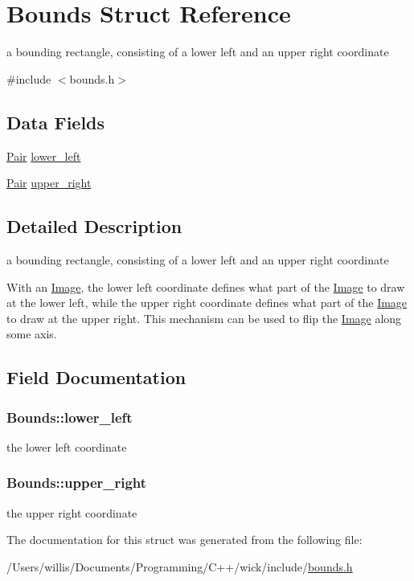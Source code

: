 \hypertarget{struct_bounds}{\section{Bounds Struct Reference}
\label{struct_bounds}
}


a bounding rectangle, consisting of a lower left and an upper right coordinate  




{\ttfamily \#include $<$bounds.\-h$>$}

\subsection*{Data Fields}
\begin{DoxyCompactItemize}
\item 
\hyperlink{struct_pair}{Pair} \hyperlink{struct_bounds_afeb7fdbefb43679fe1a47537763a2ddc}{lower\-\_\-left}
\item 
\hyperlink{struct_pair}{Pair} \hyperlink{struct_bounds_af16cda4ded29fa7a4eb016735ce20730}{upper\-\_\-right}
\end{DoxyCompactItemize}


\subsection{Detailed Description}
a bounding rectangle, consisting of a lower left and an upper right coordinate 

With an \hyperlink{struct_image}{Image}, the lower left coordinate defines what part of the \hyperlink{struct_image}{Image} to draw at the lower left, while the upper right coordinate defines what part of the \hyperlink{struct_image}{Image} to draw at the upper right. This mechanism can be used to flip the \hyperlink{struct_image}{Image} along some axis. 

\subsection{Field Documentation}
\hypertarget{struct_bounds_afeb7fdbefb43679fe1a47537763a2ddc}{
\subsubsection[{lower\-\_\-left}]{ Bounds\-::lower\-\_\-left}}\label{struct_bounds_afeb7fdbefb43679fe1a47537763a2ddc}
the lower left coordinate \hypertarget{struct_bounds_af16cda4ded29fa7a4eb016735ce20730}{
\subsubsection[{upper\-\_\-right}]{ Bounds\-::upper\-\_\-right}}\label{struct_bounds_af16cda4ded29fa7a4eb016735ce20730}
the upper right coordinate 

The documentation for this struct was generated from the following file\-:\begin{DoxyCompactItemize}
\item 
/\-Users/willis/\-Documents/\-Programming/\-C++/wick/include/\hyperlink{bounds_8h}{bounds.\-h}\end{DoxyCompactItemize}

